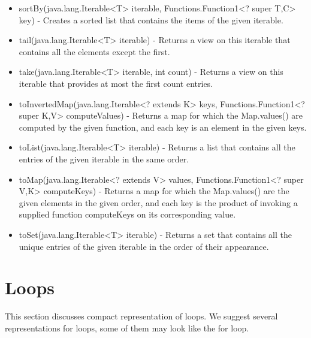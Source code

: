 \begin{itemize}
	\item sortBy(java.lang.Iterable<T> iterable, Functions.Function1<? super T,C> key) - Creates a sorted list that contains the items of the given iterable.
	\item tail(java.lang.Iterable<T> iterable) - Returns a view on this iterable that contains all the elements except the first.
	\item take(java.lang.Iterable<T> iterable, int count) - Returns a view on this iterable that provides at most the first count entries.
	\item toInvertedMap(java.lang.Iterable<? extends K> keys, Functions.Function1<? super K,V> computeValues) - Returns a map for which the Map.values() are computed by the given function, and each key is an element in the given keys.
	\item toList(java.lang.Iterable<T> iterable) - Returns a list that contains all the entries of the given iterable in the same order.
	\item toMap(java.lang.Iterable<? extends V> values, Functions.Function1<? super V,K> computeKeys) - Returns a map for which the Map.values() are the given elements in the given order, and each key is the product of invoking a supplied function computeKeys on its corresponding value.
	\item toSet(java.lang.Iterable<T> iterable) - Returns a set that contains all the unique entries of the given iterable in the order of their appearance.
\end{itemize}
\section{Loops}
This section discusses compact representation of loops. We suggest several representations for loops, some of them may look like the for loop.

